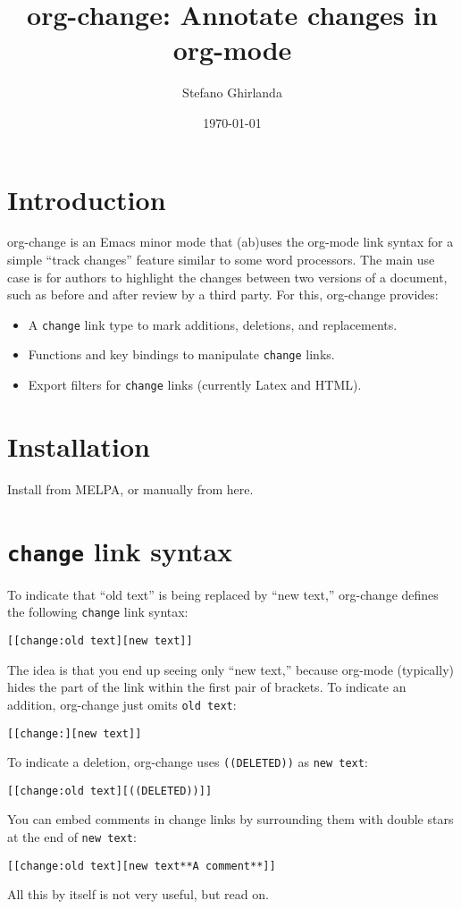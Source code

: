 \documentclass[11pt]{article}
\author{Stefano Ghirlanda}
\date{\today}
\title{org-change: Annotate changes in org-mode}
\begin{document}
\maketitle

\section{Introduction}
\label{sec:org598d7d6}

org-change is an Emacs minor mode that (ab)uses the org-mode link
syntax for a simple ``track changes'' feature similar to some word
processors. The main use case is for authors to highlight the changes
between two versions of a document, such as before and after review by
a third party. For this, org-change provides:
\begin{itemize}
\item A \texttt{change} link type to mark additions, deletions, and replacements.
\item Functions and key bindings to manipulate \texttt{change} links.
\item Export filters for \texttt{change} links (currently Latex and HTML).
\end{itemize}

\section{Installation}
\label{sec:orgb3bc902}

Install from MELPA, or manually from here.

\section{\texttt{change} link syntax}
\label{sec:org21fb566}

To indicate that ``old text'' is being replaced by ``new text,''
org-change defines the following \texttt{change} link syntax:
\begin{verbatim}
[[change:old text][new text]]
\end{verbatim}
The idea is that you end up seeing only ``new text,'' because org-mode
(typically) hides the part of the link within the first pair of
brackets. To indicate an addition, org-change just omits \texttt{old text}:
\begin{verbatim}
[[change:][new text]]
\end{verbatim}
To indicate a deletion, org-change uses \texttt{((DELETED))} as \texttt{new text}:
\begin{verbatim}
[[change:old text][((DELETED))]]
\end{verbatim}
You can embed comments in change links by surrounding them with double
stars at the end of \texttt{new text}:
\begin{verbatim}
[[change:old text][new text**A comment**]]
\end{verbatim}
All this by itself is not very useful, but read on.
\end{document}

